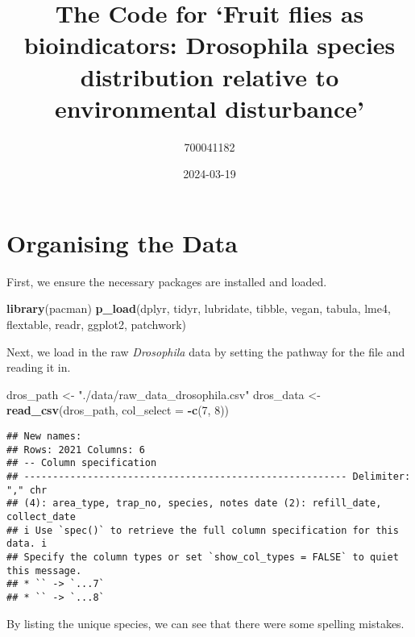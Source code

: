 \documentclass[
]{article}
\title{The Code for `Fruit flies as bioindicators: Drosophila species
distribution relative to environmental disturbance'}
\author{700041182}
\date{2024-03-19}
\newenvironment{Shaded}{\begin{snugshade}}{\end{snugshade}}
\newcommand{\AttributeTok}[1]{\textcolor[rgb]{0.13,0.29,0.53}{#1}}
\newcommand{\DecValTok}[1]{\textcolor[rgb]{0.00,0.00,0.81}{#1}}
\newcommand{\FunctionTok}[1]{\textcolor[rgb]{0.13,0.29,0.53}{\textbf{#1}}}
\newcommand{\NormalTok}[1]{#1}
\newcommand{\OtherTok}[1]{\textcolor[rgb]{0.56,0.35,0.01}{#1}}
\newcommand{\SpecialCharTok}[1]{\textcolor[rgb]{0.81,0.36,0.00}{\textbf{#1}}}
\newcommand{\StringTok}[1]{\textcolor[rgb]{0.31,0.60,0.02}{#1}}
\begin{document}
\maketitle

\hypertarget{organising-the-data}{%
\section{Organising the Data}\label{organising-the-data}}

First, we ensure the necessary packages are installed and loaded.

\begin{Shaded}
\begin{Highlighting}[]
\FunctionTok{library}\NormalTok{(pacman)}
\FunctionTok{p\_load}\NormalTok{(dplyr, tidyr, lubridate, tibble, vegan, tabula, lme4, flextable, readr, ggplot2, patchwork)}
\end{Highlighting}
\end{Shaded}

Next, we load in the raw \emph{Drosophila} data by setting the pathway
for the file and reading it in.

\begin{Shaded}
\begin{Highlighting}[]
\NormalTok{dros\_path }\OtherTok{\textless{}{-}} \StringTok{"./data/raw\_data\_drosophila.csv"}
\NormalTok{dros\_data }\OtherTok{\textless{}{-}} \FunctionTok{read\_csv}\NormalTok{(dros\_path, }\AttributeTok{col\_select =} \SpecialCharTok{{-}}\FunctionTok{c}\NormalTok{(}\DecValTok{7}\NormalTok{, }\DecValTok{8}\NormalTok{))}
\end{Highlighting}
\end{Shaded}

\begin{verbatim}
## New names:
## Rows: 2021 Columns: 6
## -- Column specification
## -------------------------------------------------------- Delimiter: "," chr
## (4): area_type, trap_no, species, notes date (2): refill_date, collect_date
## i Use `spec()` to retrieve the full column specification for this data. i
## Specify the column types or set `show_col_types = FALSE` to quiet this message.
## * `` -> `...7`
## * `` -> `...8`
\end{verbatim}

By listing the unique species, we can see that there were some spelling
mistakes.

\begin{Shaded}
\end{Shaded}
\end{document}
